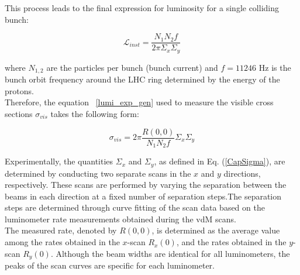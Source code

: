 This process leads to the final expression for luminosity for a single colliding bunch:

\begin{equation}
\mathcal{L}_{inst}=\frac{N_{1} N_{2}f}{2 \pi \Sigma_{x}\Sigma_{y}}
\end{equation}

where $N_{1,2}$ are the particles per bunch (bunch current) and  $f= 11246$ Hz is the bunch orbit frequency around the LHC ring determined by the energy of the protons.\\

Therefore, the equation ~\ref{lumi_exp_gen} used to measure the visible cross sections $\sigma_{vis}$ takes the following form:

\begin{equation}
  \sigma_{vis}=2\pi \frac{ R(0, 0)}{N_{1}N_{2} f} \Sigma_{x} \Sigma_{y}
  \label{sigmavis_eq}
\end{equation}

Experimentally, the quantities $\Sigma_{x}$ and $\Sigma_{y}$, as defined in Eq. (\ref{CapSigma}), are determined by conducting two separate scans in the $x$ and $y$ directions, respectively. 
These scans are performed by varying the separation between the beams in each direction  at a fixed number of separation steps.The separation steps are determined through curve fitting of the scan data based on the luminometer rate measurements obtained during the vdM scans.\\

The measured rate, denoted by $R(0,0)$, is determined as the average value among the rates obtained in the $x$-scan $R_x(0)$, and the rates obtained in the $y$-scan $R_y(0)$. Although the beam widths are identical for all luminometers, the peaks of the scan curves are specific for each luminometer.\\

